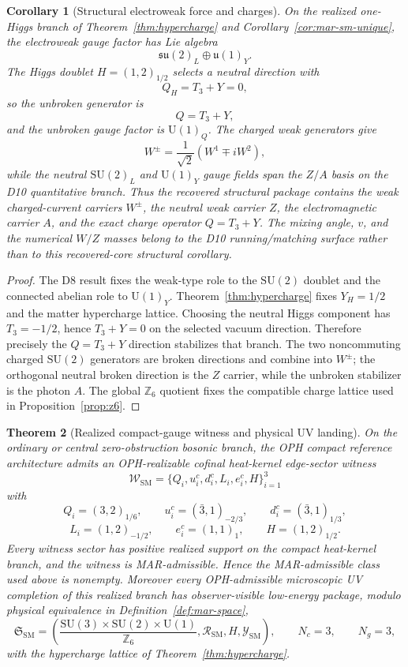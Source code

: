 \documentclass[11pt]{article}
\newtheorem{theorem}{Theorem}[section]
\newtheorem{corollary}[theorem]{Corollary}
\newcommand{\SU}{\mathrm{SU}}
\newcommand{\U}{\mathrm{U}}
\begin{document}
\begin{corollary}[Structural electroweak force and charges]\label{cor:electroweak-force}
On the realized one-Higgs branch of Theorem~\ref{thm:hypercharge} and Corollary~\ref{cor:mar-sm-unique}, the electroweak gauge factor has Lie algebra
\[
\mathfrak{su}(2)_L\oplus\mathfrak{u}(1)_Y.
\]
The Higgs doublet \(H=(1,2)_{1/2}\) selects a neutral direction with
\[
Q_H=T_3+Y=0,
\]
so the unbroken generator is
\[
Q=T_3+Y,
\]
and the unbroken gauge factor is \(\U(1)_Q\). The charged weak generators give
\[
W^\pm=\frac{1}{\sqrt2}(W^1\mp iW^2),
\]
while the neutral \(\SU(2)_L\) and \(\U(1)_Y\) gauge fields span the \(Z/A\) basis on the D10 quantitative branch. Thus the recovered structural package contains the weak charged-current carriers \(W^\pm\), the neutral weak carrier \(Z\), the electromagnetic carrier \(A\), and the exact charge operator \(Q=T_3+Y\). The mixing angle, \(v\), and the numerical \(W/Z\) masses belong to the D10 running/matching surface rather than to this recovered-core structural corollary.
\end{corollary}

\begin{proof}
The D8 result fixes the weak-type role to the \(\SU(2)\) doublet and the connected abelian role to \(\U(1)_Y\). Theorem~\ref{thm:hypercharge} fixes \(Y_H=1/2\) and the matter hypercharge lattice. Choosing the neutral Higgs component has \(T_3=-1/2\), hence \(T_3+Y=0\) on the selected vacuum direction. Therefore precisely the \(Q=T_3+Y\) direction stabilizes that branch. The two noncommuting charged \(\SU(2)\) generators are broken directions and combine into \(W^\pm\); the orthogonal neutral broken direction is the \(Z\) carrier, while the unbroken stabilizer is the photon \(A\). The global \(\mathbb Z_6\) quotient fixes the compatible charge lattice used in Proposition~\ref{prop:z6}.
\end{proof}

\begin{theorem}[Realized compact-gauge witness and physical UV landing]\label{thm:mar-witness-landing}
On the ordinary or central zero-obstruction bosonic branch, the OPH compact reference architecture admits an OPH-realizable cofinal heat-kernel edge-sector witness
\[
\mathcal W_{\mathrm{SM}}
=
\{Q_i,u_i^c,d_i^c,L_i,e_i^c,H\}_{i=1}^{3}
\]
with
\[
Q_i=(3,2)_{1/6},\qquad
u_i^c=(\bar 3,1)_{-2/3},\qquad
d_i^c=(\bar 3,1)_{1/3},
\]
\[
L_i=(1,2)_{-1/2},\qquad
e_i^c=(1,1)_1,\qquad
H=(1,2)_{1/2}.
\]
Every witness sector has positive realized support on the compact heat-kernel branch, and the witness is MAR-admissible. Hence the MAR-admissible class used above is nonempty. Moreover every OPH-admissible microscopic UV completion of this realized branch has observer-visible low-energy package, modulo physical equivalence in Definition~\ref{def:mar-space},
\[
\mathfrak S_{\mathrm{SM}}
=
\left(
\frac{\SU(3)\times\SU(2)\times\U(1)}{\mathbb Z_6},
\mathcal R_{\mathrm{SM}},
H,
\mathcal Y_{\mathrm{SM}}
\right),
\qquad
N_c=3,\qquad N_g=3,
\]
with the hypercharge lattice of Theorem~\ref{thm:hypercharge}.
\end{theorem}
\end{document}
